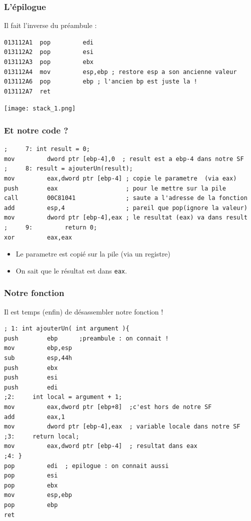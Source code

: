 \documentclass{beamer}
\begin{document}
\begin{frame}[fragile]
\frametitle{L'épilogue}
Il fait l'inverse du préambule :
\begin{lstlisting}[language={[x86masm]Assembler}, basicstyle={\scriptsize\ttfamily}]
013112A1  pop         edi
013112A2  pop         esi
013112A3  pop         ebx
013112A4  mov         esp,ebp ; restore esp a son ancienne valeur
013112A6  pop         ebp ; l'ancien bp est juste la !
013112A7  ret
\end{lstlisting}
\texttt{[image: stack\_1.png]}
\end{frame}

\begin{frame}[fragile]
\frametitle{Et notre code ?}
\begin{lstlisting}[language={[x86masm]Assembler}, basicstyle={\scriptsize\ttfamily}]
;     7: int result = 0;
mov         dword ptr [ebp-4],0  ; result est a ebp-4 dans notre SF 
;     8: result = ajouterUn(result);
mov         eax,dword ptr [ebp-4] ; copie le parametre  (via eax)
push        eax                   ; pour le mettre sur la pile 
call        00C81041              ; saute a l'adresse de la fonction
add         esp,4                 ; pareil que pop(ignore la valeur)
mov         dword ptr [ebp-4],eax ; le resultat (eax) va dans result
;     9:         return 0;
xor         eax,eax  
\end{lstlisting}
\begin{itemize}
\item Le parametre est copié sur la pile (via un registre)
\item On sait que le résultat est dans \texttt{eax}.
\end{itemize}
\end{frame}

\begin{frame}[fragile]
\frametitle{Notre fonction}
Il est temps (enfin) de désassembler notre fonction !
\begin{lstlisting}[language={[x86masm]Assembler}, basicstyle={\scriptsize\ttfamily}]
; 1: int ajouterUn( int argument ){
push        ebp      ;preambule : on connait !
mov         ebp,esp  
sub         esp,44h  
push        ebx  
push        esi  
push        edi  
;2: 	int local = argument + 1;
mov         eax,dword ptr [ebp+8]  ;c'est hors de notre SF
add         eax,1  
mov         dword ptr [ebp-4],eax  ; variable locale dans notre SF
;3: 	return local;
mov         eax,dword ptr [ebp-4]  ; resultat dans eax
;4: }
pop         edi  ; epilogue : on connait aussi
pop         esi  
pop         ebx  
mov         esp,ebp  
pop         ebp  
ret  
\end{lstlisting}

\end{frame}
\end{document}

